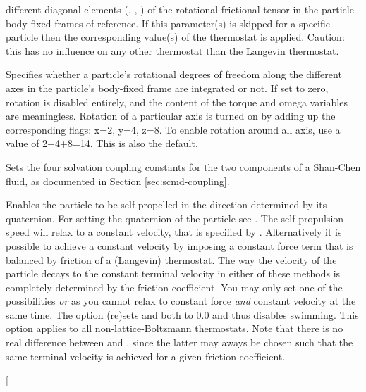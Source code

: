 \begin{arguments}
  different diagonal elements (, , )
  of the rotational frictional tensor in the particle body-fixed frames
  of reference. If this parameter(s) is skipped for a specific particle
  then the corresponding value(s) of the thermostat is applied.
  Caution: this has no influence on any other thermostat
  than the Langevin thermostat.
\item[\opt{rotation \var{rot}}] Specifies whether a particle's
  rotational degrees of freedom along the different axes in the particle's body-fixed frame are integrated or not.
  If set to zero, rotation is disabled entirely, and the content of the torque and omega variables
  are meaningless. 
  Rotation of a particular axis is turned on by adding up the corresponding flags: x=2, y=4, z=8.
  To enable rotation around all axis, use a value of 2+4+8=14. This is also the default.
\item[\opt{solvation \var{lA} \var{kA} \var{lB} \var{kB}}] Sets the
  four solvation coupling constants for the two components of a
  Shan-Chen fluid, as documented in Section \ref{sec:scmd-coupling}.
\item[\opt{swimming \alt{\alt{v_swim \var{v\_swim} \asep f_swim
        \var{f\_swim}} \asep off}}] Enables the particle to be
  self-propelled in the direction determined by its quaternion. For
  setting the quaternion of the particle see . The
  self-propulsion speed will relax to a constant velocity, that is
  specified by . Alternatively it is possible to
  achieve a constant velocity by imposing a constant force term
   that is balanced by friction of a (Langevin)
  thermostat. The way the velocity of the particle decays to the
  constant terminal velocity in either of these methods is completely
  determined by the friction coefficient. You may only set one of the
  possibilities  \emph{or}  as you
  cannot relax to constant force \emph{and} constant velocity at the
  same time. The option  (re)sets  and
   both to $0.0$ and thus disables swimming. This option
  applies to all non-lattice-Boltzmann thermostats. Note that there is
  no real difference between  and ,
  since the latter may aways be chosen such that the same terminal
  velocity is achieved for a given friction coefficient.
\item[{\parbox[t]{\linewidth}{}}
\end{arguments}
